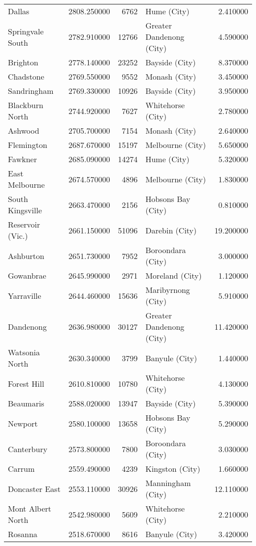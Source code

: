 \begin{table}
\begin{tabular}{lrrlr}
Dallas & 2808.250000 & 6762 & Hume (City) & 2.410000 \\
Springvale South & 2782.910000 & 12766 & Greater Dandenong (City) & 4.590000 \\
Brighton & 2778.140000 & 23252 & Bayside (City) & 8.370000 \\
Chadstone & 2769.550000 & 9552 & Monash (City) & 3.450000 \\
Sandringham & 2769.330000 & 10926 & Bayside (City) & 3.950000 \\
Blackburn North & 2744.920000 & 7627 & Whitehorse (City) & 2.780000 \\
Ashwood & 2705.700000 & 7154 & Monash (City) & 2.640000 \\
Flemington & 2687.670000 & 15197 & Melbourne (City) & 5.650000 \\
Fawkner & 2685.090000 & 14274 & Hume (City) & 5.320000 \\
East Melbourne & 2674.570000 & 4896 & Melbourne (City) & 1.830000 \\
South Kingsville & 2663.470000 & 2156 & Hobsons Bay (City) & 0.810000 \\
Reservoir (Vic.) & 2661.150000 & 51096 & Darebin (City) & 19.200000 \\
Ashburton & 2651.730000 & 7952 & Boroondara (City) & 3.000000 \\
Gowanbrae & 2645.990000 & 2971 & Moreland (City) & 1.120000 \\
Yarraville & 2644.460000 & 15636 & Maribyrnong (City) & 5.910000 \\
Dandenong & 2636.980000 & 30127 & Greater Dandenong (City) & 11.420000 \\
Watsonia North & 2630.340000 & 3799 & Banyule (City) & 1.440000 \\
Forest Hill & 2610.810000 & 10780 & Whitehorse (City) & 4.130000 \\
Beaumaris & 2588.020000 & 13947 & Bayside (City) & 5.390000 \\
Newport & 2580.100000 & 13658 & Hobsons Bay (City) & 5.290000 \\
Canterbury & 2573.800000 & 7800 & Boroondara (City) & 3.030000 \\
Carrum & 2559.490000 & 4239 & Kingston (City) & 1.660000 \\
Doncaster East & 2553.110000 & 30926 & Manningham (City) & 12.110000 \\
Mont Albert North & 2542.980000 & 5609 & Whitehorse (City) & 2.210000 \\
Rosanna & 2518.670000 & 8616 & Banyule (City) & 3.420000 \\

\end{tabular}
\end{table}
